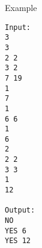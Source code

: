 Example
\begin{verbatim}
Input:
3
3
2 2
3 2
7 19
1
7
1
6 6
1
6
2
2 2
3 3
1
12

Output:
NO
YES 6
YES 12
\end{verbatim}